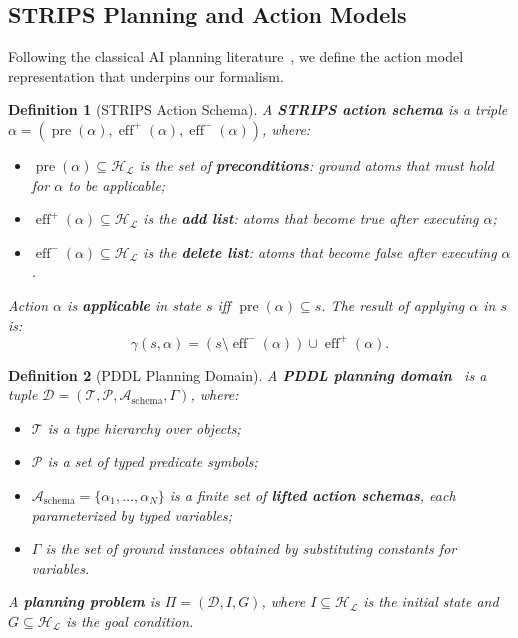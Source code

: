 \documentclass{article}
\newtheorem{definition}{Definition}
\DeclareMathOperator{\pre}{pre}
\DeclareMathOperator{\eff}{eff}
\newcommand{\calA}{\mathcal{A}}
\newcommand{\calD}{\mathcal{D}}
\newcommand{\calH}{\mathcal{H}}
\newcommand{\calL}{\mathcal{L}}
\newcommand{\calP}{\mathcal{P}}
\newcommand{\calT}{\mathcal{T}}
\begin{document}
\subsection{STRIPS Planning and Action Models}
\label{sec:strips}

Following the classical AI planning literature~\cite{fikes1971strips, ghallab2004automated}, we define the action model representation that underpins our formalism.

\begin{definition}[STRIPS Action Schema]
\label{def:strips}
A \textbf{STRIPS action schema} is a triple $\alpha = (\pre(\alpha), \eff^+(\alpha), \eff^-(\alpha))$, where:
\begin{itemize}[nosep]
    \item $\pre(\alpha) \subseteq \calH_{\calL}$ is the set of \textbf{preconditions}: ground atoms that must hold for $\alpha$ to be applicable;
    \item $\eff^+(\alpha) \subseteq \calH_{\calL}$ is the \textbf{add list}: atoms that become true after executing $\alpha$;
    \item $\eff^-(\alpha) \subseteq \calH_{\calL}$ is the \textbf{delete list}: atoms that become false after executing $\alpha$.
\end{itemize}
Action $\alpha$ is \textbf{applicable} in state $s$ iff $\pre(\alpha) \subseteq s$.  The result of applying $\alpha$ in $s$ is:
\begin{equation}
\label{eq:strips_transition}
\gamma(s, \alpha) = (s \setminus \eff^-(\alpha)) \cup \eff^+(\alpha).
\end{equation}
\end{definition}

\begin{definition}[PDDL Planning Domain]
\label{def:pddl_domain}
A \textbf{PDDL planning domain}~\cite{mcdermott1998pddl, fox2003pddl2} is a tuple $\calD = (\calT, \calP, \calA_{\text{schema}}, \Gamma)$, where:
\begin{itemize}[nosep]
    \item $\calT$ is a type hierarchy over objects;
    \item $\calP$ is a set of typed predicate symbols;
    \item $\calA_{\text{schema}} = \{\alpha_1, \ldots, \alpha_N\}$ is a finite set of \textbf{lifted action schemas}, each parameterized by typed variables;
    \item $\Gamma$ is the set of ground instances obtained by substituting constants for variables.
\end{itemize}
A \textbf{planning problem} is $\Pi = (\calD, I, G)$, where $I \subseteq \calH_{\calL}$ is the initial state and $G \subseteq \calH_{\calL}$ is the goal condition.
\end{definition}
\end{document}
